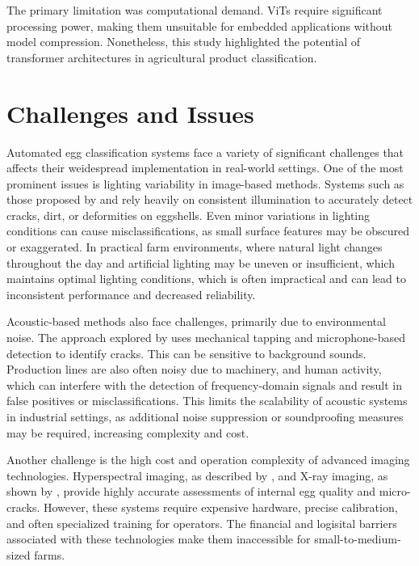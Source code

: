 \documentclass[conference]{IEEEtran}
\begin{document}
	The primary limitation was computational demand. ViTs require significant processing power, making them unsuitable for embedded applications without model compression. Nonetheless, this study highlighted the potential of transformer architectures in agricultural product classification.
	
	\section{Challenges and Issues}
	
	Automated egg classification systems face a variety of significant challenges that affects their weidespread implementation in real-world settings. One of the most prominent issues is lighting variability in image-based methods. Systems such as those proposed by \cite{zhang2020cnn} and \cite{singh2022vision} rely heavily on consistent illumination to accurately detect cracks, dirt, or deformities on eggshells. Even minor variations in lighting conditions can cause misclassifications, as small surface features may be obscured or exaggerated. In practical farm environments, where natural light changes throughout the day and artificial lighting may be uneven or insufficient, which maintains optimal lighting conditions, which is often impractical and can lead to inconsistent performance and decreased reliability.
	
	Acoustic-based methods also face challenges, primarily due to environmental noise. The approach explored by \cite{wang2021acoustic} uses mechanical tapping and microphone-based detection to identify cracks. This can be sensitive to background sounds. Production lines are also often noisy due to machinery, and human activity, which can interfere with the detection of frequency-domain signals and result in false positives or misclassifications. This limits the scalability of acoustic systems in industrial settings, as additional noise suppression or soundproofing measures may be required, increasing complexity and cost.
	
	Another challenge is the high cost and operation complexity of advanced imaging technologies. Hyperspectral imaging, as described by \cite{li2021hsi}, and X-ray imaging, as shown by \cite{kumar2023xray}, provide highly accurate assessments of internal egg quality and micro-cracks. However, these systems require expensive hardware, precise calibration, and often specialized training for operators. The financial and logisital barriers associated with these technologies make them inaccessible for small-to-medium-sized farms.
	
\end{document}
